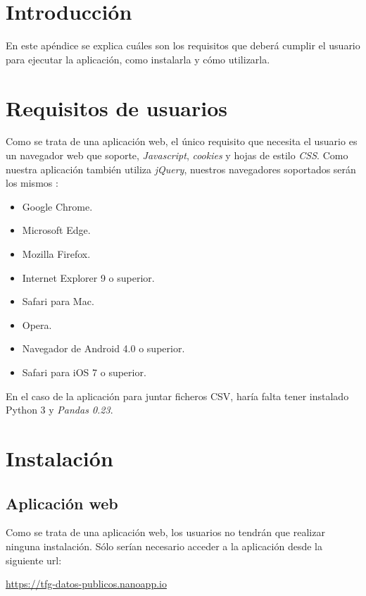 
\section{Introducción}

En este apéndice se explica cuáles son los requisitos que deberá cumplir el usuario para ejecutar la aplicación, como instalarla y cómo utilizarla.

\section{Requisitos de usuarios}

Como se trata de una aplicación web, el único requisito que necesita el usuario es un navegador web que soporte, \textit{Javascript}, \textit{cookies} y hojas de estilo \textit{CSS}. Como nuestra aplicación también utiliza \textit{jQuery}, nuestros navegadores soportados serán los mismos \cite{misc:jquerybrowsers}:

\begin{itemize}
	\item Google Chrome.
	\item Microsoft Edge.
	\item Mozilla Firefox.
	\item Internet Explorer 9 o superior.
	\item Safari para Mac.
	\item Opera.
	\item Navegador de Android 4.0 o superior.
	\item Safari para iOS 7 o superior.
\end{itemize}

En el caso de la aplicación para juntar ficheros CSV, haría falta tener instalado Python 3 y \textit{Pandas 0.23}.

\section{Instalación}

\subsection{Aplicación web}

Como se trata de una aplicación web, los usuarios no tendrán que realizar ninguna instalación. Sólo serían necesario acceder a la aplicación desde la siguiente url:

\href{https://tfg-datos-publicos.nanoapp.io}{https://tfg-datos-publicos.nanoapp.io}

